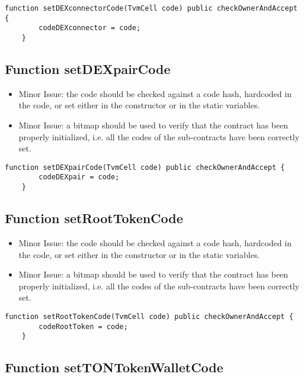 \begin{lstlisting}[firstnumber=88]
	function setDEXconnectorCode(TvmCell code) public checkOwnerAndAccept {
		codeDEXconnector = code;
	}
\end{lstlisting}

\subsection{Function setDEXpairCode}

\begin{itemize}
\item Minor Issue: the code should be checked against a code hash,
  hardcoded in the code, or set either in the constructor or in the
  static variables.
\item Minor Issue: a bitmap should be used to verify that the contract
  has been properly initialized, i.e. all the codes of the
  sub-contracts have been correctly set.
\end{itemize}

\begin{lstlisting}[firstnumber=84]
	function setDEXpairCode(TvmCell code) public checkOwnerAndAccept {
		codeDEXpair = code;
	}
\end{lstlisting}

\subsection{Function setRootTokenCode}

\begin{itemize}
\item Minor Issue: the code should be checked against a code hash,
  hardcoded in the code, or set either in the constructor or in the
  static variables.
\item Minor Issue: a bitmap should be used to verify that the contract
  has been properly initialized, i.e. all the codes of the
  sub-contracts have been correctly set.
\end{itemize}

\begin{lstlisting}[firstnumber=92]
	function setRootTokenCode(TvmCell code) public checkOwnerAndAccept {
		codeRootToken = code;
	}
\end{lstlisting}

\subsection{Function setTONTokenWalletCode}

